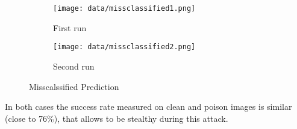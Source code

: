 \begin{figure}[htbp]
    \centering
    \begin{subfigure}[b]{0.45\textwidth}
        \texttt{[image: data/missclassified1.png]}
        \caption{First run}
        \label{fig:misclassified1}
    \end{subfigure}
    \hfill
    \begin{subfigure}[b]{0.45\textwidth}
        \texttt{[image: data/missclassified2.png]}
        \caption{Second run}
        \label{fig:misclassified2}
    \end{subfigure}
    \caption{Misscalssified Prediction}
    \label{fig:missclassified}
\end{figure}
In both cases the success rate measured on clean and poison images is similar (close to 76\%), that allows to be stealthy during this attack.


